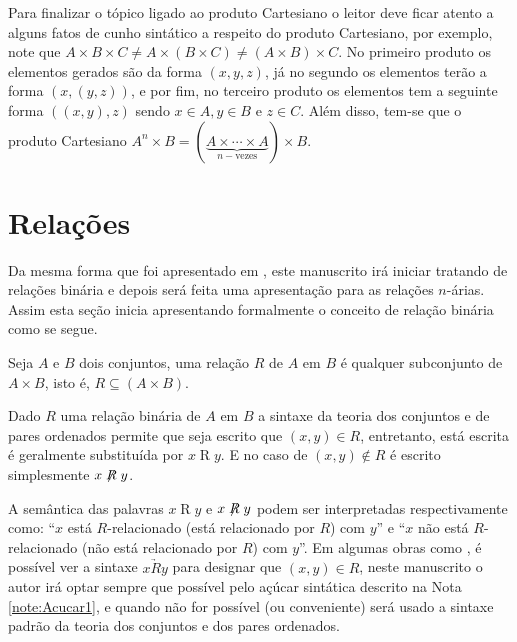 \begin{remark}
	Para finalizar o tópico ligado ao produto Cartesiano o leitor deve ficar atento a alguns fatos de cunho sintático a respeito do produto Cartesiano, por exemplo, note que $A \times B \times C \neq A \times (B \times C) \neq (A \times B) \times C$. No primeiro produto os elementos gerados são da forma $(x, y, z)$, já no segundo os elementos terão a forma $(x, (y, z))$, e por fim, no terceiro produto os elementos tem a seguinte forma $((x,y), z)$ sendo $x \in A, y \in B$ e $z \in C$. Além disso, tem-se que o produto Cartesiano $A^n \times B = (\underbrace{A \times \cdots \times A}_{n-\text{vezes}}) \times B$.
\end{remark}

\section{Relações}\label{sec:Relacoes}

Da mesma forma que foi apresentado em \cite{abe1991-TC}, este manuscrito irá iniciar tratando de relações binária e depois será feita uma apresentação para as relações $n$-árias. Assim esta seção inicia apresentando formalmente o conceito de relação binária como se segue.

\begin{definition}\label{def:RelacaoBinaria}
	Seja $A$ e $B$ dois conjuntos, uma relação $R$ de $A$ em $B$ é qualquer subconjunto de $A \times B$, isto é, $R \subseteq (A \times B)$.
\end{definition}

\begin{note}\label{note:Acucar1}
	Dado $R$ uma relação binária de $A$ em $B$ a sintaxe da teoria dos conjuntos e de pares ordenados permite que seja escrito que $(x, y) \in R$, entretanto, está escrita é geralmente substituída por $x\mathrel{R}y$. E no caso de $(x,y) \notin R$ é escrito simplesmente $x\centernot{R}y$.
\end{note}

A semântica das palavras $x\mathrel{R}y$ e $x\centernot{R}y$ podem ser interpretadas respectivamente como: ``$x$ está $R$-relacionado (está relacionado por $R$) com $y$'' e ``$x$ não está $R$-relacionado (não está relacionado por $R$) com $y$''. Em algumas obras como \cite{carmo2013}, é possível ver a sintaxe $x \underrightarrow{R} y$ para designar que $(x, y) \in R$, neste manuscrito o autor irá optar sempre que possível pelo açúcar sintática descrito na Nota \ref{note:Acucar1}, e quando não for possível (ou conveniente) será usado a sintaxe padrão da teoria dos conjuntos e dos pares ordenados.

